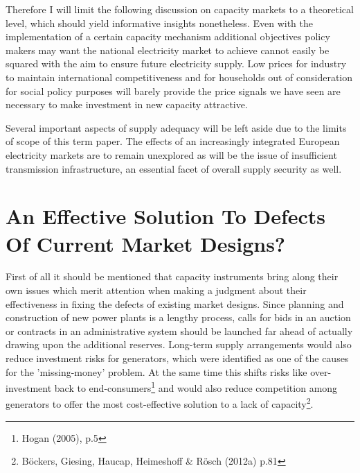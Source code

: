\documentclass[11pt,a4paper,english]{scrreprt}
\begin{document}
Therefore I will limit the following discussion on capacity markets to a
theoretical level, which should yield informative insights nonetheless. Even
with the implementation of a certain capacity mechanism additional objectives
policy makers may want the national electricity market to achieve cannot easily
be squared with the aim to ensure future electricity supply. Low prices for
industry to maintain international competitiveness and for households out of
consideration for social policy purposes will barely provide the price signals
we have seen are necessary to make investment in new capacity attractive.\par


Several important aspects of supply adequacy will be left aside due to the
limits of scope of this term paper. The effects of an increasingly integrated
European electricity markets are to remain unexplored as will be the issue
of insufficient transmission infrastructure, an essential facet of overall
supply security as well.\par


  \section{An Effective Solution To Defects Of Current Market Designs?}


  
First of all it should be mentioned that capacity instruments bring along their
own issues which merit attention when making a judgment about their
effectiveness in fixing the defects of existing market designs. Since planning
and construction of new power plants is a lengthy process, calls for bids in an
auction or contracts  in an administrative system should be launched far ahead
of actually drawing upon the additional reserves. Long-term supply arrangements
would also reduce investment risks for generators, which were identified as one
of the causes for the 'missing-money' problem. At the same time this shifts
risks like over-investment back to end-consumers\footnote{Hogan (2005), p.5} and
would also reduce competition among generators to offer the most cost-effective
solution to a lack of capacity\footnote{B\"{o}ckers, Giesing, Haucap, Heimeshoff
\& R\"{o}sch (2012a) p.81}.\par
  
  
  
\end{document}

